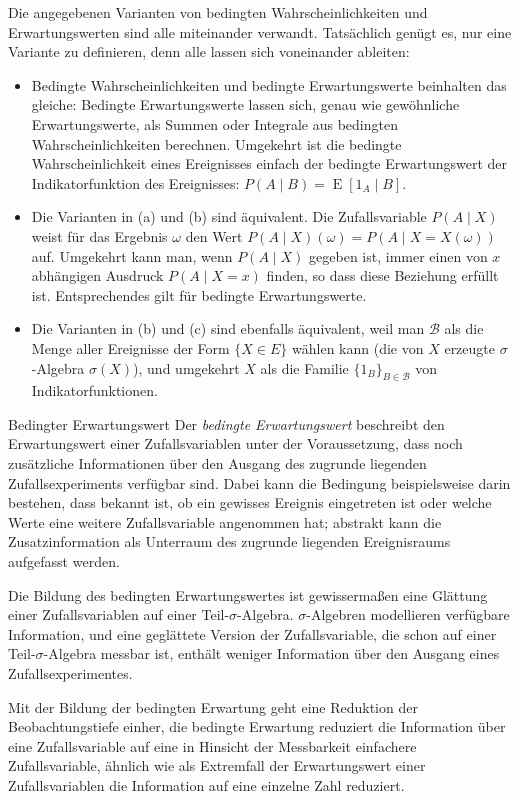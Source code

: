 Die angegebenen Varianten von bedingten Wahrscheinlichkeiten und Erwartungswerten sind alle miteinander verwandt. Tatsächlich genügt es, nur eine Variante zu definieren, denn alle lassen sich voneinander ableiten:
\begin{itemize}
    \item Bedingte Wahrscheinlichkeiten und bedingte Erwartungswerte beinhalten das gleiche: Bedingte Erwartungswerte lassen sich, genau wie gewöhnliche Erwartungswerte, als Summen oder Integrale aus bedingten Wahrscheinlichkeiten berechnen.
          Umgekehrt ist die bedingte Wahrscheinlichkeit eines Ereignisses einfach der bedingte Erwartungswert der Indikatorfunktion des Ereignisses:
          $P(A \mid B) = \operatorname{E} [1_A \mid B]$.
    \item Die Varianten in (a) und (b) sind äquivalent.
          Die Zufallsvariable $P(A \mid X)$ weist für das Ergebnis $\omega$ den Wert $P(A \mid X)(\omega) = P(A \mid X = X(\omega))$ auf.
          Umgekehrt kann man, wenn $P(A \mid X)$ gegeben ist, immer einen von $x$ abhängigen Ausdruck $P(A \mid X = x)$ finden, so dass diese Beziehung erfüllt ist.
          Entsprechendes gilt für bedingte Erwartungswerte.
    \item Die Varianten in (b) und (c) sind ebenfalls äquivalent, weil man $\mathcal{B}$ als die Menge aller Ereignisse der Form $\{X \in E\}$ wählen kann (die von $X$ erzeugte $\sigma$-Algebra $\sigma(X)$), und umgekehrt $X$ als die Familie $\{1_B\}_{B \in \mathcal{B}}$ von Indikatorfunktionen.
\end{itemize}

\begin{defi}{Bedingter Erwartungswert}
    Der \emph{bedingte Erwartungswert} beschreibt den Erwartungswert einer Zufallsvariablen unter der Voraussetzung, dass noch zusätzliche Informationen über den Ausgang des zugrunde liegenden Zufallsexperiments verfügbar sind.
    Dabei kann die Bedingung beispielsweise darin bestehen, dass bekannt ist, ob ein gewisses Ereignis eingetreten ist oder welche Werte eine weitere Zufallsvariable angenommen hat; abstrakt kann die Zusatzinformation als Unterraum des zugrunde liegenden Ereignisraums aufgefasst werden.

    Die Bildung des bedingten Erwartungswertes ist gewissermaßen eine Glättung einer Zufallsvariablen auf einer Teil-$\sigma$-Algebra.
    $\sigma$-Algebren modellieren verfügbare Information, und eine geglättete Version der Zufallsvariable, die schon auf einer Teil-$\sigma$-Algebra messbar ist, enthält weniger Information über den Ausgang eines Zufallsexperimentes.

    Mit der Bildung der bedingten Erwartung geht eine Reduktion der Beobachtungstiefe einher, die bedingte Erwartung reduziert die Information über eine Zufallsvariable auf eine in Hinsicht der Messbarkeit einfachere Zufallsvariable, ähnlich wie als Extremfall der Erwartungswert einer Zufallsvariablen die Information auf eine einzelne Zahl reduziert.
\end{defi}

